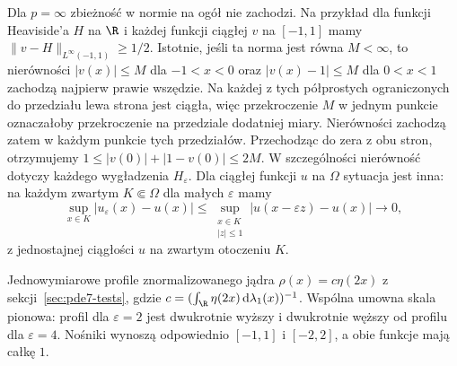 \begin{uwaga}
Dla $p=\infty$ zbieżność w normie na ogół nie zachodzi.
Na przykład dla funkcji Heaviside'a $H$ na $\R$
i każdej funkcji ciągłej $v$ na $[-1,1]$ mamy
$\|v-H\|_{L^\infty(-1,1)}\ge1/2$.
Istotnie, jeśli ta norma jest równa $M<\infty$,
to nierówności $|v(x)|\le M$ dla $-1<x<0$
oraz $|v(x)-1|\le M$ dla $0<x<1$ zachodzą
najpierw prawie wszędzie. Na każdej z tych
półprostych ograniczonych do przedziału
lewa strona jest ciągła, więc przekroczenie $M$
w jednym punkcie oznaczałoby przekroczenie
na przedziale dodatniej miary. Nierówności
zachodzą zatem w każdym punkcie tych przedziałów.
Przechodząc do zera z obu stron, otrzymujemy
$1\le |v(0)|+|1-v(0)|\le2M$.
W szczególności nierówność dotyczy każdego
wygładzenia $H_\varepsilon$.
Dla ciągłej funkcji $u$ na $\Omega$ sytuacja
jest inna: na każdym zwartym $K\Subset\Omega$
dla małych $\varepsilon$ mamy
\[
 \sup_{x\in K}|u_\varepsilon(x)-u(x)|
 \le\sup_{\substack{x\in K\\|z|\le1}}
 |u(x-\varepsilon z)-u(x)|\longrightarrow0,
\]
z jednostajnej ciągłości $u$ na zwartym
otoczeniu $K$.
\end{uwaga}

\begin{center}
\par\smallskip\small
Jednowymiarowe profile znormalizowanego jądra
$\rho(x)=c\eta(2x)$ z sekcji~\ref{sec:pde7-tests},
gdzie $c=(\int_{\R}\eta(2x)\,\mathrm d\lambda_1(x))^{-1}$.
Wspólna umowna skala pionowa: profil dla
$\varepsilon=2$ jest dwukrotnie wyższy i dwukrotnie
węższy od profilu dla $\varepsilon=4$.
Nośniki wynoszą odpowiednio $[-1,1]$ i $[-2,2]$,
a obie funkcje mają całkę $1$.
\end{center}

